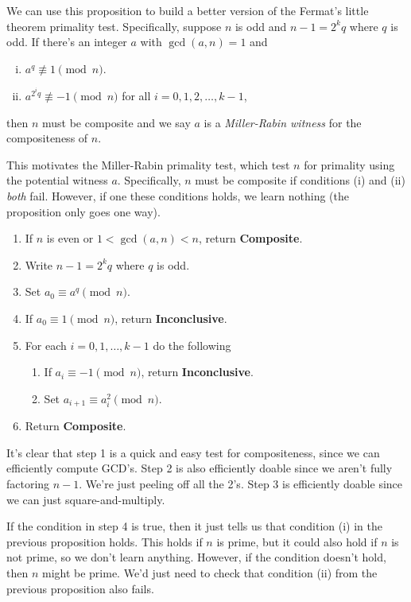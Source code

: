 \documentclass[12pt]{article}
\theoremstyle{plain}
\theoremstyle{definition}
\theoremstyle{remark}
\begin{document}
We can use this proposition to build a better version of the Fermat's little theorem primality test.
Specifically, suppose $n$ is odd and $n-1 = 2^kq$ where $q$ is odd.
If there's an integer $a$ with $\gcd(a,n) = 1$ and
\begin{enumerate}[(i)]
    \item $a^q\not \equiv 1\pmod n$.
    \item $a^{2^iq}\not\equiv -1\pmod n$ for all $i = 0, 1, 2, \ldots, k-1$,
\end{enumerate}
then $n$ must be composite and we say $a$ is a \emph{Miller-Rabin witness} for the compositeness of $n$.

This motivates the Miller-Rabin primality test, which test $n$ for primality using the potential witness $a$.
Specifically, $n$ must be composite if conditions (i) and (ii) \emph{both} fail.
However, if one these conditions holds, we learn nothing (the proposition only goes one way).
\begin{enumerate}
    \item If $n$ is even or $1< \gcd(a,n) < n$, return \textbf{Composite}.
    \item Write $n-1 = 2^kq$ where $q$ is odd.
    \item Set $a_0 \equiv a^q\pmod n$.
    \item If $a_0 \equiv 1\pmod n$, return \textbf{Inconclusive}.
    \item For each $i = 0, 1, \ldots, k-1$ do the following
    \begin{enumerate}
        \item If $a_i \equiv -1\pmod n$, return \textbf{Inconclusive}.
        \item Set $a_{i+1} \equiv a_i^2\pmod n$.
    \end{enumerate}
    \item Return \textbf{Composite}.
\end{enumerate}

It's clear that step 1 is a quick and easy test for compositeness, since we can efficiently compute GCD's.
Step 2 is also efficiently doable since we aren't fully factoring $n-1$.
We're just peeling off all the 2's.
Step 3 is efficiently doable since we can just square-and-multiply.

If the condition in step 4 is true, then it just tells us that condition (i) in the previous proposition holds.
This holds if $n$ is prime, but it could also hold if $n$ is not prime, so we don't learn anything.
However, if the condition doesn't hold, then $n$ might be prime.
We'd just need to check that condition (ii) from the previous proposition also fails.
\end{document}
